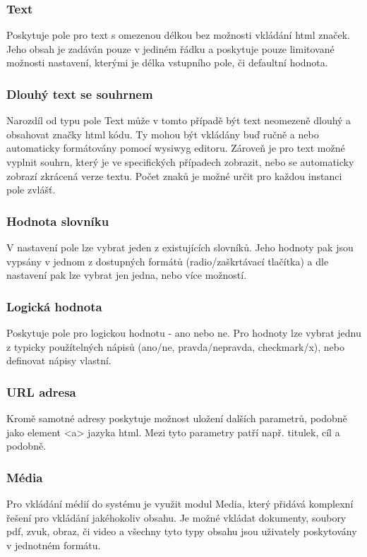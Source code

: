 \subsubsection*{Text}
Poskytuje pole pro text s omezenou délkou bez možnosti vkládání html značek. Jeho obsah je zadáván pouze v jediném řádku a poskytuje pouze limitované možnosti nastavení, kterými je délka vstupního pole, či defaultní hodnota. 

\subsubsection*{Dlouhý text se souhrnem}
Narozdíl od typu pole Text může v tomto případě být text neomezeně dlouhý a obsahovat značky html kódu. Ty mohou být vkládány buď ručně a nebo automaticky formátovány pomocí \gls{wysiwyg} editoru. Zároveň je pro text možné vyplnit souhrn, který je ve specifických případech zobrazit, nebo se automaticky zobrazí zkrácená verze textu. Počet znaků je možné určit pro každou instanci pole zvlášť.

\subsubsection*{Hodnota slovníku}
V nastavení pole lze vybrat jeden z existujících slovníků. Jeho hodnoty pak jsou vypsány v jednom z dostupných formátů (radio/zaškrtávací tlačítka) a dle nastavení pak lze vybrat jen jedna, nebo více možností.

\subsubsection*{Logická hodnota}
Poskytuje pole pro logickou hodnotu - ano nebo ne. Pro hodnoty lze vybrat jednu z typicky použítelných nápisů (ano/ne, pravda/nepravda, checkmark/x), nebo definovat nápisy vlastní. 

\subsubsection*{URL adresa}
Kromě samotné adresy poskytuje možnost uložení dalších parametrů, podobně jako element <a> jazyka html. Mezi tyto parametry patří např. titulek, cíl a podobně.

\subsubsection*{Média}
Pro vkládání médií do systému je využit modul Media, který přidává komplexní řešení pro vkládání jakéhokoliv obsahu. Je možné vkládat dokumenty, soubory pdf, zvuk, obraz, či video a všechny tyto typy obsahu jsou uživately poskytovány v jednotném formátu.

